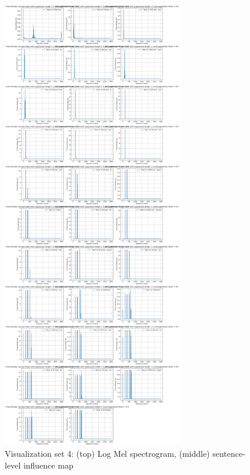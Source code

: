 \documentclass[../report.tex]{subfiles}
\begin{document}
\begin{figure}[p]
        \includegraphics[width=0.7\textwidth,height=0.5\textheight]{figures/loss_diff_sentence_4_word.png}
        \caption{Visualization set 4: (top) Log Mel spectrogram, (middle) sentence-level influence map}
        \label{fig:viz_set4}
    \end{figure}
\end{document}
